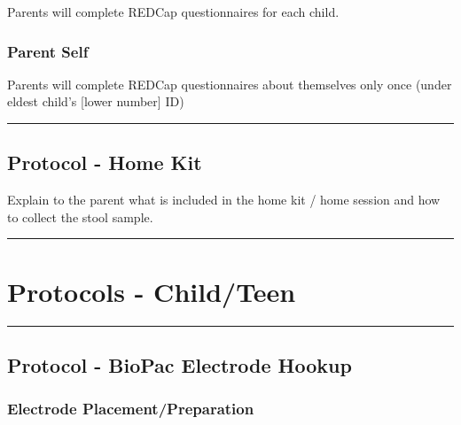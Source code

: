\documentclass[]{book}
\begin{document}
Parents will complete REDCap questionnaires for each child.

\hypertarget{parent-self}{%
\subsubsection{Parent Self}\label{parent-self}}

Parents will complete REDCap questionnaires about themselves only once (under eldest child's {[}lower number{]} ID)

\begin{center}\rule{0.5\linewidth}{0.5pt}\end{center}

\hypertarget{protocol---home-kit}{%
\subsection{Protocol - Home Kit}\label{protocol---home-kit}}

Explain to the parent what is included in the home kit / home session and how to collect the stool sample.

\begin{center}\rule{0.5\linewidth}{0.5pt}\end{center}

\hypertarget{protocols---childteen}{%
\section{Protocols - Child/Teen}\label{protocols---childteen}}

\begin{center}\rule{0.5\linewidth}{0.5pt}\end{center}

\hypertarget{protocol---biopac-electrode-hookup}{%
\subsection{Protocol - BioPac Electrode Hookup}\label{protocol---biopac-electrode-hookup}}

\hypertarget{electrode-placementpreparation}{%
\subsubsection{Electrode Placement/Preparation}\label{electrode-placementpreparation}}
\end{document}
